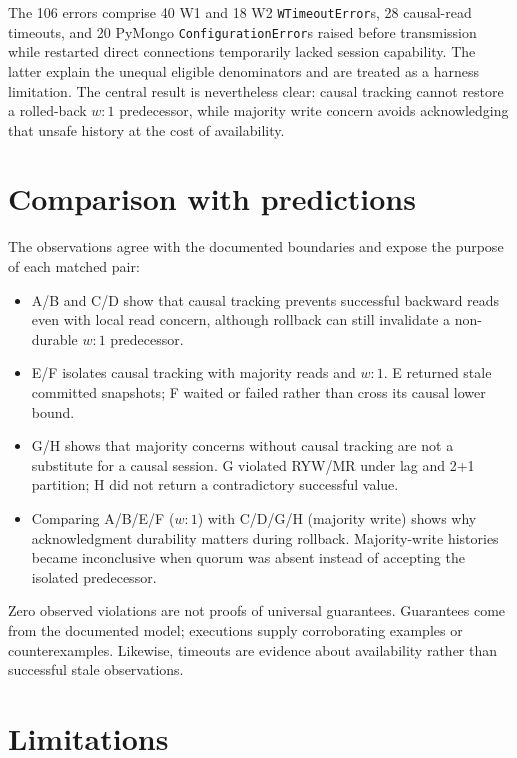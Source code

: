 \documentclass[11pt,a4paper]{article}
\begin{document}
The 106 errors comprise 40 W1 and 18 W2 \texttt{WTimeoutError}s, 28 causal-read timeouts, and
20 PyMongo \texttt{ConfigurationError}s raised before transmission while restarted direct
connections temporarily lacked session capability. The latter explain the unequal eligible
denominators and are treated as a harness limitation. The central result is nevertheless
clear: causal tracking cannot restore a rolled-back $w:1$ predecessor, while majority write
concern avoids acknowledging that unsafe history at the cost of availability.
\FloatBarrier

\section{Comparison with predictions}

The observations agree with the documented boundaries and expose the purpose of each matched
pair:
\begin{itemize}
  \item A/B and C/D show that causal tracking prevents successful backward reads even with
  local read concern, although rollback can still invalidate a non-durable $w:1$ predecessor.
  \item E/F isolates causal tracking with majority reads and $w:1$. E returned stale committed
  snapshots; F waited or failed rather than cross its causal lower bound.
  \item G/H shows that majority concerns without causal tracking are not a substitute for a
  causal session. G violated RYW/MR under lag and 2+1 partition; H did not return a
  contradictory successful value.
  \item Comparing A/B/E/F ($w:1$) with C/D/G/H (majority write) shows why acknowledgment
  durability matters during rollback. Majority-write histories became inconclusive when
  quorum was absent instead of accepting the isolated predecessor.
\end{itemize}

Zero observed violations are not proofs of universal guarantees. Guarantees come from the
documented model; executions supply corroborating examples or counterexamples. Likewise,
timeouts are evidence about availability rather than successful stale observations.

\section{Limitations}
\end{document}
